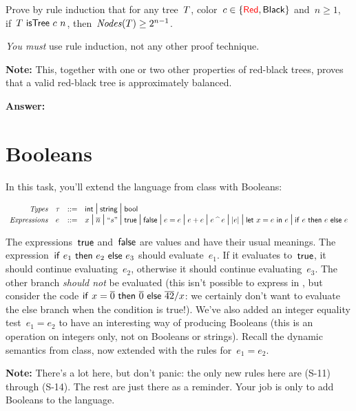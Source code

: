 \documentclass{article}
\begin{document}
\begin{task}
  Prove by rule induction that for any tree~$T$,
  color~$c \in \{{\color{red}{\mathsf{Red}}}, \mathsf{Black}\}$ and~$n \geq 1$,
  if~$T ~\mathsf{isTree}~c~n$, then~$\mathit{Nodes}(T) \geq 2^{n-1}$.

  {\em You must} use rule induction, not any other proof technique.

  \textbf{Note:} This, together with one or two other properties of
  red-black trees, proves that a valid red-black tree is approximately
  balanced.
\end{task}

\textbf{Answer:}
    
\section{Booleans}

In this task, you'll extend the {\Elang} language from class with Booleans:

\[
\begin{array}{r l l l}
  \mathit{Types} & \tau & \mathop{::=} &
  \mathsf{int} \mbox{\Large $\,\mid\,$} \mathsf{string} \mbox{\Large $\,\mid\,$} \mathsf{bool}\\
  \mathit{Expressions} & e & \mathop{::=} &
  x \mbox{\Large $\,\mid\,$}
  \overline{n} \mbox{\Large $\,\mid\,$}
  \text{``}s\text{''} \mbox{\Large $\,\mid\,$}
  \mathsf{true} \mbox{\Large $\,\mid\,$}
  \mathsf{false} \mbox{\Large $\,\mid\,$}
  e = e \mbox{\Large $\,\mid\,$}
  e + e \mbox{\Large $\,\mid\,$}
  e \mathbin{\text{\textasciicircum}} e \mbox{\Large $\,\mid\,$}
  |e| \mbox{\Large $\,\mid\,$}
  \mathsf{let}~x=e~\mathsf{in}~e \mbox{\Large $\,\mid\,$}
  \mathsf{if}~e~\mathsf{then}~e~\mathsf{else}~e
\end{array}
\]

The expressions~$\mathsf{true}$ and~$\mathsf{false}$ are values and have their usual
meanings.
%
The expression~$\mathsf{if}~e_1~\mathsf{then}~e_2~\mathsf{else}~e_3$ should evaluate~$e_1$. If it evaluates
to~$\mathsf{true}$, it should continue evaluating~$e_2$, otherwise it should
continue evaluating~$e_3$.
%
The other branch {\em should not} be evaluated (this isn't possible to express
in {\Elang}, but consider the code $\mathsf{if}~x = \overline{0}~\mathsf{then}~\overline{0}~\mathsf{else}~\overline{42} / x$: we certainly
don't want to evaluate the else branch when the condition is true!).
%
We've also added an integer equality test~$e_1 = e_2$ to have an interesting
way of producing Booleans (this is an operation on integers only, not on
Booleans or strings).
%
Recall the dynamic semantics from class, now extended with the rules
for~$e_1 = e_2$.

\textbf{Note:} There's a lot here, but don't panic:
the only new rules here are (S-11) through (S-14). The rest are just there
as a reminder. Your job is only to add Booleans to the language.
\end{document}
